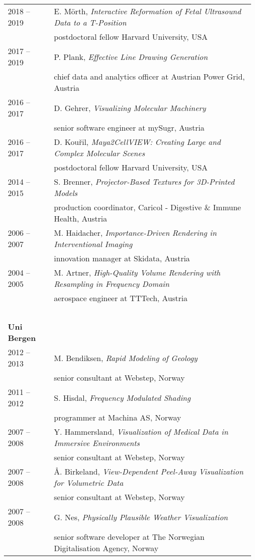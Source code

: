 \documentclass[a4paper,11pt]{letter}
\begin{document}
\begin{tabular}{l| l}
2018 -- 2019 & E. M\"orth, \emph{Interactive Reformation of Fetal Ultrasound Data to a T-Position} \\
 & postdoctoral fellow Harvard University, USA \\
2017 -- 2019 & P. Plank, \emph{Effective Line Drawing Generation} \\
 & chief data and analytics officer at Austrian Power Grid, Austria \\
2016 -- 2017 & D. Gehrer, \emph{Visualizing Molecular Machinery} \\
 & senior software engineer at mySugr, Austria \\
2016 -- 2017 & D. Kou{\v r}il, \emph{Maya2CellVIEW: Creating Large and Complex Molecular Scenes} \\
 & postdoctoral fellow Harvard University, USA \\
2014 -- 2015 & S. Brenner, \emph{Projector-Based Textures for 3D-Printed Models} \\
 & production coordinator, Caricol - Digestive \& Immune Health, Austria \\
2006 -- 2007 & M. Haidacher, \emph{Importance-Driven Rendering in Interventional Imaging} \\
 & innovation manager at Skidata, Austria \\
2004 -- 2005 & M. Artner, \emph{High-Quality Volume Rendering with Resampling in Frequency Domain} \\
 & aerospace engineer at TTTech, Austria \\
\hline
\multicolumn{2}{l}{\textbf{~}} \\
\textbf{Uni Bergen} & \\
2012 -- 2013 & M. Bendiksen, \emph{Rapid Modeling of Geology} \\
 & senior consultant at Webstep, Norway \\
2011 -- 2012 & S. Hisdal, \emph{Frequency Modulated Shading} \\
 & programmer at Machina AS, Norway \\
2007 -- 2008 & Y. Hammersland, \emph{Visualization of Medical Data in Immersive Environments} \\
 & senior consultant at Webstep, Norway \\
2007 -- 2008 & \AA. Birkeland, \emph{View-Dependent Peel-Away Visualization for Volumetric Data} \\
 & senior consultant at Webstep, Norway \\
2007 -- 2008 & G. Nes, \emph{Physically Plausible Weather Visualization} \\
 & senior software developer at The Norwegian Digitalisation Agency, Norway \\
\end{tabular}
\end{document}
